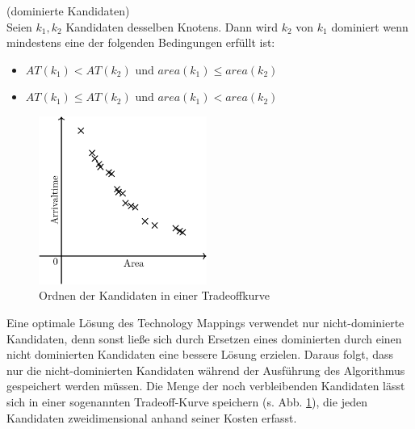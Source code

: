 \documentclass[11pt, a4paper, german]{article}
\begin{document}
\begin{definition}{(dominierte Kandidaten)}\\
	Seien $k_1, k_2$ Kandidaten desselben Knotens. Dann wird $k_2$ von $k_1$ dominiert wenn mindestens eine der folgenden Bedingungen erfüllt ist:
	\begin{itemize}
	\item $AT(k_1) < AT(k_2) \text { und  }area(k_1) \leq area(k_2)$
	\item $	AT(k_1) \leq AT(k_2) \text{ und } area(k_1) < area(k_2)$	
	\end{itemize}
\end{definition}

 \begin{figure}
		\includegraphics[width = 5.5cm]{pictures/compiled/tradeoff_kurve}
		\caption{Ordnen der Kandidaten in einer Tradeoffkurve}
		\label{bild:tradeoff_kurve}
\end{figure}
Eine optimale Lösung des Technology Mappings verwendet nur nicht-dominierte Kandidaten, denn sonst ließe sich durch Ersetzen eines dominierten durch einen nicht dominierten Kandidaten eine bessere Lösung erzielen.
Daraus folgt, dass nur die nicht-dominierten Kandidaten während der Ausführung des Algorithmus gespeichert werden müssen.
Die Menge der noch verbleibenden Kandidaten lässt sich in einer sogenannten Tradeoff-Kurve speichern (s. Abb. \ref{bild:tradeoff_kurve}), die jeden Kandidaten zweidimensional anhand seiner Kosten erfasst.
\end{document}
